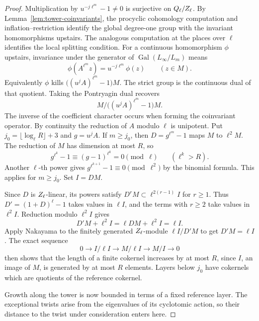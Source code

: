 \begin{proof}
Multiplication by
\(u^{-j\ell^m}-1\ne0\) is surjective on \(Q_\ell/Z_\ell\).
By Lemma~\ref{lem:tower-coinvariants}, the procyclic cohomology computation and
inflation--restriction identify the global degree-one group
with the invariant homomorphisms upstairs. The analogous computation
at the places over \(\ell\) identifies the local splitting condition.
For a continuous homomorphism \(\phi\) upstairs, invariance
under the generator of \(\operatorname{Gal}(L_\infty/L_m)\)
means
\[
 \phi(A^{\ell^m}z)=u^{-j\ell^m}\phi(z)\qquad (z\in M).
\]
Equivalently \(\phi\) kills \(\big((u^j A)^{\ell^m}-1\big)M\).
The strict group is the continuous dual of that quotient.
Taking the Pontryagin dual recovers
\[
   M/\bigl((u^j A)^{\ell^m}-1\bigr)M.
\]
The inverse of the coefficient character occurs when forming
the coinvariant operator.
By continuity the reduction of \(A\) modulo \(\ell\)
is unipotent. Put \(j_0=\lfloor\log_\ell R\rfloor+3\) and
\(g=u^jA\). If \(m\ge j_0\), then \(D=g^{\ell^m}-1\)
maps \(M\) to \(\ell^2M\). The reduction of \(M\) has dimension at most \(R\), so
\[
   g^{\ell^k}-1\equiv(g-1)^{\ell^k}=0\pmod\ell
   \qquad(\ell^k>R).
\]
Another \(\ell\)-th power gives \(g^{\ell^{k+1}}-1\equiv0\pmod{\ell^2}\)
by the binomial formula. This applies for \(m\ge j_0\). Set \(I=DM\).

Since \(D\)
is \(Z_\ell\)-linear, its powers satisfy
\(D^r M\subset\ell^{2(r-1)}I\) for \(r\ge1\).
Thus \(D'=(1+D)^\ell-1\) takes values in \(\ell I\), and
the terms with \(r\ge2\) take values in \(\ell^2 I\).
Reduction modulo \(\ell^2 I\) gives
\[
      D'M+\ell^2 I=\ell DM+\ell^2I=\ell I.
\]
Apply Nakayama to the finitely generated \(Z_\ell\)-module \(\ell I/D'M\)
to get \(D'M=\ell I\). The exact sequence
\[
 0\longrightarrow I/\ell I\longrightarrow M/\ell I
       \longrightarrow M/I\longrightarrow 0
\]
then shows that the length of a finite cokernel increases by
at most \(R\), since \(I\), an image of \(M\), is generated
by at most \(R\) elements. Layers below \(j_0\) have cokernels
which are quotients of the reference cokernel.


Growth along the tower is now bounded in terms of a fixed reference layer. The exceptional twists arise from the eigenvalues of its cyclotomic action, so their distance to the twist under consideration enters here.


\end{proof}
